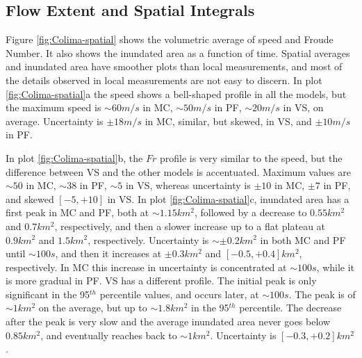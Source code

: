 \documentclass{article}
\begin{document}
\subsection{Flow Extent and Spatial Integrals}
Figure \ref{fig:Colima-spatial} shows the volumetric average of speed and Froude Number. It also shows the inundated area as a function of time. Spatial averages and inundated area have smoother plots than local measurements, and most of the details observed in local measurements are not easy to discern. In plot \ref{fig:Colima-spatial}a the speed shows a bell-shaped profile in all the models, but the maximum speed is $\sim 60 m/s$ in MC, $\sim 50 m/s$ in PF, $\sim 20 m/s$ in VS, on average. Uncertainty is $\pm 18 m/s$ in MC, similar, but skewed, in VS, and $\pm 10 m/s$ in PF.

In plot \ref{fig:Colima-spatial}b, the $Fr$ profile is very similar to the speed, but the difference between VS and the other models is accentuated. Maximum values are $\sim 50$ in MC, $\sim 38$ in PF, $\sim 5$ in VS, whereas uncertainty is $\pm 10$ in MC, $\pm 7$ in PF, and skewed $[-5, +10]$ in VS. In plot \ref{fig:Colima-spatial}c, inundated area has a first peak in MC and PF, both at $\sim 1.15 km^2$, followed by a decrease to $0.55 km^2$ and $0.7 km^2$, respectively, and then a slower increase up to a flat plateau at $0.9 km^2$ and $1.5 km^2$, respectively. Uncertainty is $\sim \pm 0.2 km^2$ in both MC and PF until $\sim 100 s$, and then it increases at $\pm 0.3 km^2$ and $[-0.5, +0.4] km^2$, respectively. In MC this increase in uncertainty is concentrated at $\sim 100 s$, while it is more gradual in PF. VS has a different profile. The initial peak is only significant in the 95$^{th}$ percentile values, and occurs later, at $\sim 100 s$. The peak is of $\sim 1 km^2$ on the average, but up to $\sim 1.8 km^2$ in the 95$^{th}$ percentile. The decrease after the peak is very slow and the average inundated area never goes below $0.85 km^2$, and eventually reaches back to $\sim 1 km^2$. Uncertainty is $[-0.3, +0.2] km^2$.
\end{document}
